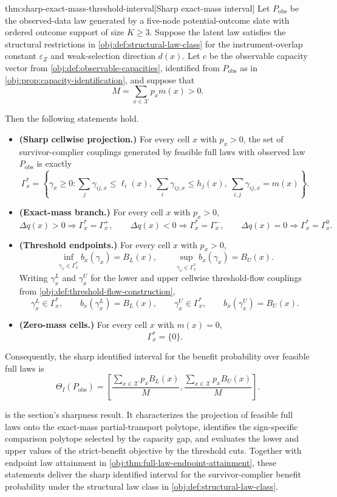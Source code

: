 \documentclass[11pt]{article}
\begin{document}
\begin{theoremv}{thm:sharp-exact-mass-threshold-interval}[Sharp exact-mass interval]
Let \(P_{\mathrm{obs}}\) be the observed-data law generated by a five-node potential-outcome slate with ordered outcome support of size \(K\ge 3\).  Suppose the latent law satisfies the structural restrictions in \cref{obj:def:structural-law-class} for the instrument-overlap constant \(\varepsilon_Z\) and weak-selection direction \(d(x)\).  Let \(c\) be the observable capacity vector from \cref{obj:def:observable-capacities}, identified from \(P_{\mathrm{obs}}\) as in \cref{obj:prop:capacity-identification}, and suppose that
\[
M=\sum_{x\in\mathcal X}p_xm(x)>0.
\]

Then the following statements hold.
\begin{itemize}
\item \textbf{(Sharp cellwise projection.)} For every cell \(x\) with \(p_x>0\), the set of survivor-complier couplings generated by feasible full laws with observed law \(P_{\mathrm{obs}}\) is exactly
\[
\Gamma_x^{\ast}
=
\left\{\gamma_x\ge0:
\sum_j\gamma_{ij,x}\le \ell_i(x),\ 
\sum_i\gamma_{ij,x}\le h_j(x),\ 
\sum_{i,j}\gamma_{ij,x}=m(x)
\right\}.
\]
\item \textbf{(Exact-mass branch.)} For every cell \(x\) with \(p_x>0\),
\[
\Delta q(x)>0 \Rightarrow \Gamma_x^{\ast}=\Gamma_x^{+},\qquad
\Delta q(x)<0 \Rightarrow \Gamma_x^{\ast}=\Gamma_x^{-},\qquad
\Delta q(x)=0 \Rightarrow \Gamma_x^{\ast}=\Gamma_x^{0}.
\]
\item \textbf{(Threshold endpoints.)} For every cell \(x\) with \(p_x>0\),
\[
\inf_{\gamma_x\in\Gamma_x^{\ast}} b_x(\gamma_x)=B_L(x),
\qquad
\sup_{\gamma_x\in\Gamma_x^{\ast}} b_x(\gamma_x)=B_U(x).
\]
Writing \(\gamma_x^L\) and \(\gamma_x^U\) for the lower and upper cellwise threshold-flow couplings from \cref{obj:def:threshold-flow-construction},
\[
\gamma_x^L\in\Gamma_x^{\ast},\qquad
b_x(\gamma_x^L)=B_L(x),\qquad
\gamma_x^U\in\Gamma_x^{\ast},\qquad
b_x(\gamma_x^U)=B_U(x).
\]
\item \textbf{(Zero-mass cells.)} For every cell \(x\) with \(m(x)=0\),
\[
\Gamma_x^{\ast}=\{0\}.
\]
\end{itemize}
Consequently, the sharp identified interval for the benefit probability over feasible full laws is
\[
\Theta_I(P_{\mathrm{obs}})
=
\left[
\frac{\sum_{x\in\mathcal X}p_xB_L(x)}{M},
\frac{\sum_{x\in\mathcal X}p_xB_U(x)}{M}
\right].
\]
\end{theoremv}

 is the section's sharpness result. It characterizes the projection of feasible full laws onto the exact-mass partial-transport polytope, identifies the sign-specific comparison polytope selected by the capacity gap, and evaluates the lower and upper values of the strict-benefit objective by the threshold cuts. Together with endpoint law attainment in \cref{obj:thm:full-law-endpoint-attainment}, these statements deliver the sharp identified interval for the survivor-complier benefit probability  under the structural law class in \cref{obj:def:structural-law-class}.
\end{document}
